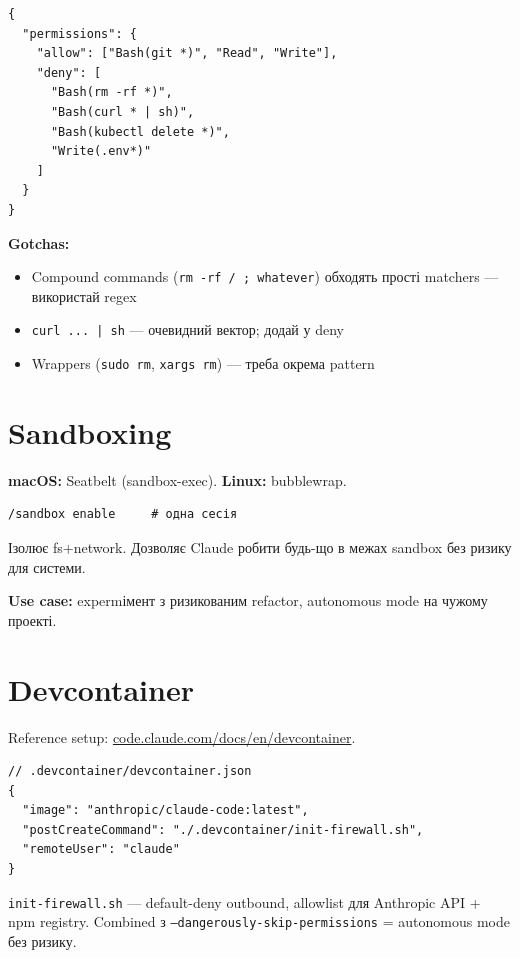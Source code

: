 \documentclass[11pt,a4paper]{article}
\begin{document}
\begin{lstlisting}
{
  "permissions": {
    "allow": ["Bash(git *)", "Read", "Write"],
    "deny": [
      "Bash(rm -rf *)",
      "Bash(curl * | sh)",
      "Bash(kubectl delete *)",
      "Write(.env*)"
    ]
  }
}
\end{lstlisting}

\textbf{Gotchas:}

\begin{itemize}
\item Compound commands (\texttt{rm -rf / ; whatever}) обходять прості matchers --- використай regex
\item \texttt{curl ... | sh} --- очевидний вектор; додай у deny
\item Wrappers (\texttt{sudo rm}, \texttt{xargs rm}) --- треба окрема pattern
\end{itemize}

\section{Sandboxing}

\textbf{macOS:} Seatbelt (sandbox-exec). \textbf{Linux:} bubblewrap.

\begin{lstlisting}
/sandbox enable     # одна сесія
\end{lstlisting}

Ізолює fs+network. Дозволяє Claude робити будь-що в межах sandbox без ризику для системи.

\textbf{Use case:} expermімент з ризикованим refactor, autonomous mode на чужому проекті.

\section{Devcontainer}

Reference setup: \href{https://code.claude.com/docs/en/devcontainer}{code.claude.com/docs/en/devcontainer}.

\begin{lstlisting}
// .devcontainer/devcontainer.json
{
  "image": "anthropic/claude-code:latest",
  "postCreateCommand": "./.devcontainer/init-firewall.sh",
  "remoteUser": "claude"
}
\end{lstlisting}

\texttt{init-firewall.sh} --- default-deny outbound, allowlist для Anthropic API + npm registry. Combined з \texttt{--dangerously-skip-permissions} = autonomous mode без ризику.
\end{document}
